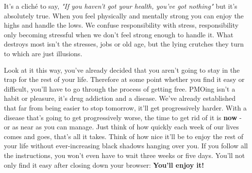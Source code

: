 \documentclass[easypeasy.tex]{subfiles}
\begin{document}
It's a cliché to say, \textit{"If you haven't got your health, you've got nothing"} but it's absolutely true. When you feel physically and mentally strong you can enjoy the highs and handle the lows. We confuse responsibility with stress, responsibility only becoming stressful when we don't feel strong enough to handle it. What destroys most isn't the stresses, jobs or old age, but the lying crutches they turn to which are just illusions.

Look at it this way, you've already decided that you aren't going to stay in the trap for the rest of your life. Therefore at some point whether you find it easy or difficult, you'll have to go through the process of getting free. PMOing isn't a habit or pleasure, it's drug addiction and a disease. We've already established that far from being easier to stop tomorrow, it'll get progressively harder. With a disease that's going to get progressively worse, the time to get rid of it is \textbf{now} - or as near as you can manage. Just think of how quickly each week of our lives comes and goes, that's all it takes. Think of how nice it'll be to enjoy the rest of your life without ever-increasing black shadows hanging over you. If you follow all the instructions, you won't even have to wait three weeks or five days. You'll not only find it easy after closing down your browser: \textbf{You'll enjoy it!}
\end{document}
